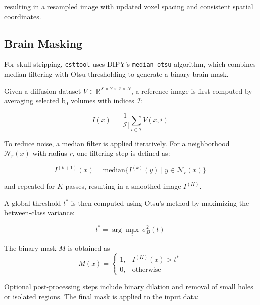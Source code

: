resulting in a resampled image with updated voxel spacing and consistent spatial coordinates.

\subsection{Brain Masking}
\label{subsec:methods_brainmasking}

For skull stripping, \texttt{csttool} uses DIPY's \texttt{median\_otsu} algorithm, which combines median filtering with Otsu thresholding to generate a binary brain mask.

Given a diffusion dataset $V \in \mathbb{R}^{X \times Y \times Z \times N}$, a reference image is first computed by averaging selected b$_0$ volumes with indices $\mathcal{I}$:

\begin{equation}
	I(x) = \frac{1}{|\mathcal{I}|} \sum_{i \in \mathcal{I}} V(x,i)
	\label{eq:median_otsu_b0}
\end{equation}

To reduce noise, a median filter is applied iteratively. For a neighborhood $\mathcal{N}_r(x)$ with radius $r$, one filtering step is defined as:

\begin{equation}
	I^{(k+1)}(x) = \mathrm{median} \{ I^{(k)}(y) \mid y \in \mathcal{N}_r(x) \}
	\label{eq:median_otsu_median}
\end{equation}

and repeated for $K$ passes, resulting in a smoothed image $I^{(K)}$.

A global threshold $t^*$ is then computed using Otsu's method by maximizing the between-class variance:

\begin{equation}
	t^* = \arg\max_{t} \ \sigma_B^2(t)
	\label{eq:median_otsu_otsu}
\end{equation}

The binary mask $M$ is obtained as
\begin{equation}
	M(x) =
	\begin{cases}
		1, & I^{(K)}(x) > t^* \\
		0, & \text{otherwise}
	\end{cases}
	\label{eq:median_otsu_mask}
\end{equation}

Optional post-processing steps include binary dilation and removal of small holes or isolated regions. The final mask is applied to the input data:


